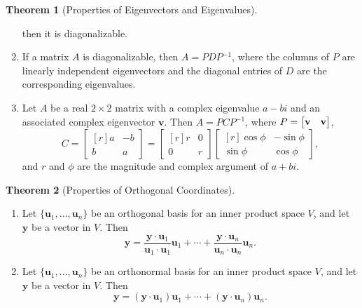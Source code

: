 \documentclass{myart}
\renewcommand{\vec}[1]{\ensuremath{\mathbf{#1}}}
\newcommand{\mat}[1]{\ensuremath{#1}}
\newcommand{\by}{\ensuremath{\times}}
\newcommand{\MAT}[2][r]{\ensuremath{\begin{bmatrix*}[#1]#2\end{bmatrix*}}}
\newcommand{\set}[1]{\ensuremath{\{#1\}}}
\newcommand{\inv}{\ensuremath{^{-1}}}
\newcommand{\many}[2][n]{\ensuremath{{#2}_1, \ldots, {#2}_{#1}}}
\let\Re\relax
\DeclareMathOperator{\Re}{Re}
\let\Im\relax
\DeclareMathOperator{\Im}{Im}
\renewcommand{\dot}{\cdot}
\theoremstyle{definition}
\newtheorem{thm}{Theorem}
\begin{document}
\begin{thm}[Properties of Eigenvectors and Eigenvalues]
\begin{enumerate}
    then it is diagonalizable.
  \item If a matrix \mat A is diagonalizable, then $\mat A = \mat
    P\mat D\mat P\inv$, where the columns of \mat P are linearly
    independent eigenvectors and the diagonal entries of \mat D are
    the corresponding eigenvalues.
  \item Let \mat A be a real $2 \by 2$ matrix with a complex
    eigenvalue $a - bi$ and an associated complex eigenvector \vec v.
    Then $\mat A = \mat P\mat C\mat P\inv$, where $\mat P = \MAT{\Re
      \vec v & \Im \vec v}$,
    \begin{equation*}
      \mat C = \MAT{a & -b \\ b & a}
             = \MAT{r & 0 \\ 0 & r}
               \MAT{\cos \phi & -\sin \phi \\ \sin \phi & \cos \phi},
    \end{equation*}
    and $r$ and $\phi$ are the magnitude and complex argument of $a +
    bi$.
  \end{enumerate}
\end{thm}

\begin{thm}[Properties of Orthogonal Coordinates] \hfill
  \begin{enumerate}
  \item Let \set{\many{\vec u}} be an orthogonal basis for an inner
    product space $V$, and let \vec y be a vector in $V$. Then
    \begin{equation*}
      \vec y = \frac{\vec y \dot \vec u_1}{\vec u_1 \dot \vec u_1} \vec u_1
             + \cdots
             + \frac{\vec y \dot \vec u_n}{\vec u_n \dot \vec u_n} \vec u_n.
    \end{equation*}
  \item Let \set{\many{\vec u}} be an orthonormal basis for an inner
    product space $V$, and let \vec y be a vector in $V$. Then
    \begin{equation*}
      \vec y = (\vec y \dot \vec u_1) \vec u_1
             + \cdots
             + (\vec y \dot \vec u_n) \vec u_n.
    \end{equation*}
  \end{enumerate}
\end{thm}
\end{document}

